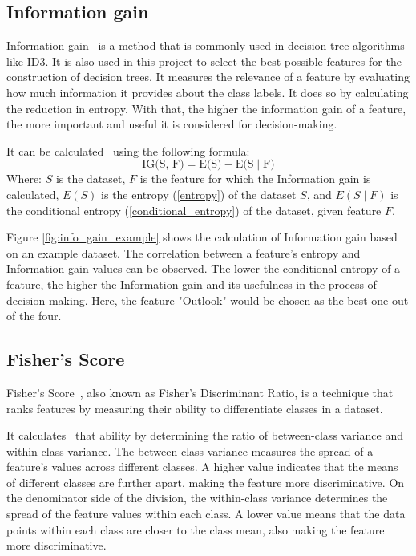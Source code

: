 \subsection{Information gain} \label{information_gain}
Information gain~\cite{feature_selection} is a method that is commonly used in decision tree algorithms like ID3. It is also used in this project to select the best possible features for the construction of decision trees. It measures the relevance of a feature by evaluating how much information it provides about the class labels. It does so by calculating the reduction in entropy. With that, the higher the information gain of a feature, the more important and useful it is considered for decision-making.

It can be calculated~\cite{information_gain_wiki} using the following formula:
\[ \text{IG(S, F)} = \text{E(S)} - \text{E(S}\mid \text{F)}\]
Where: $S$ is the dataset, $F$ is the feature for which the Information gain is calculated, $E(S)$ is the entropy (\ref{entropy}) of the dataset $S$, and $E(S\mid F)$ is the conditional entropy (\ref{conditional_entropy}) of the dataset, given feature $F$.

Figure \ref{fig:info_gain_example} shows the calculation of Information gain based on an example dataset.
The correlation between a feature's entropy and Information gain values can be observed. The lower the conditional entropy of a feature, the higher the Information gain and its usefulness in the process of decision-making. Here, the feature "Outlook" would be chosen as the best one out of the four.

\subsection{Fisher's Score}
Fisher's Score~\cite{feature_selection}, also known as Fisher's Discriminant Ratio, is a technique that ranks features by measuring their ability to differentiate classes in a dataset.

It calculates~\cite{feature_selection_fishers_score} that ability by determining the ratio of between-class variance and within-class variance. The between-class variance measures the spread of a feature's values across different classes. A higher value indicates that the means of different classes are further apart, making the feature more discriminative. On the denominator side of the division, the within-class variance determines the spread of the feature values within each class. A lower value means that the data points within each class are closer to the class mean, also making the feature more discriminative.

